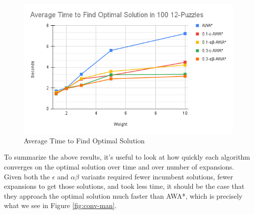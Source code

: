 \begin{figure}
    \begin{center}\includegraphics[scale=0.35]{media/Average Time to Find Optimal Solution in 100 12-Puzzles.png}\end{center}
    \caption{Average Time to Find Optimal Solution}\label{fig:run}
\end{figure}

To summarize the above results, it's useful to look at how quickly each algorithm converges on the optimal solution over time and over number of expansions. Given both the $\epsilon$ and $\alpha\beta$ variants required fewer incumbent solutions, fewer expansions to get those solutions, and took less time, it should be the case that they approach the optimal solution much faster than AWA*, which is precisely what we see in Figure \ref{fig:conv-man}.

